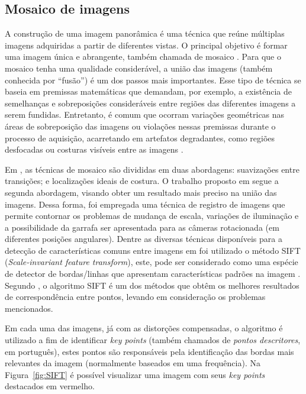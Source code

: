 \subsection{Mosaico de imagens}

A construção de uma imagem panorâmica é uma técnica que reúne múltiplas imagens adquiridas a partir de diferentes vistas. O principal objetivo é formar uma imagem única e abrangente, também chamada de mosaico \cite{Shum:2000}. Para que o mosaico tenha uma qualidade considerável, a união das imagens (também conhecida por ``fusão'') é um dos passos mais importantes. Esse tipo de técnica se baseia em premissas matemáticas que demandam, por exemplo, a existência de semelhanças e sobreposições consideráveis entre regiões das diferentes imagens a serem fundidas. Entretanto, é comum que ocorram variações geométricas nas áreas de sobreposição das imagens ou violações nessas premissas durante o processo de aquisição, acarretando em artefatos degradantes, como regiões desfocadas ou costuras visíveis entre as imagens \cite{Gracias:2009}.

Em \cite{Levin:2004}, as técnicas de mosaico são divididas em duas abordagens: suavizações entre transições; e localizações ideais de costura. O trabalho proposto em  \cite{Lin:2013} segue a segunda abordagem, visando obter um resultado mais preciso na união das imagens. Dessa forma, foi empregada uma técnica de registro de imagens que permite contornar os problemas de mudança de escala, variações de iluminação e 
a possibilidade da garrafa ser apresentada para as câmeras rotacionada (em diferentes posições angulares). Dentre as diversas técnicas disponíveis para a detecção de características comuns entre imagens em \cite{Lin:2013} foi utilizado o método SIFT (\textit{Scale-invariant feature transform}), este, pode ser considerado como uma espécie de detector de bordas/linhas que apresentam características padrões na imagem  \cite{Lowe:2001}. Segundo \cite{Mikolajczyk:2005}, o algoritmo SIFT é um dos métodos que obtêm os melhores resultados de correspondência entre pontos, levando em consideração os problemas mencionados.

Em cada uma das imagens, já com as distorções compensadas, o algoritmo é utilizado a fim de identificar \textit{key points} (também chamados de \textit{pontos descritores}, em português), estes pontos são responsáveis pela identificação das bordas mais relevantes da imagem (normalmente baseados em uma frequência). Na Figura~\ref{fig:SIFT} é possível visualizar uma imagem com seus \textit{key points} destacados em vermelho. 

